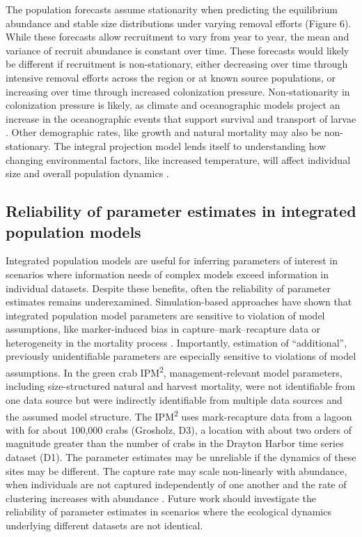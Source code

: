 \documentclass{article}
\begin{document}
The population forecasts assume stationarity when predicting the equilibrium abundance and stable size distributions under varying removal efforts (Figure 6). While these forecasts allow recruitment to vary from year to year, the mean and variance of recruit abundance is constant over time. These forecasts would likely be different if recruitment is non-stationary, either decreasing over time through intensive removal efforts across the region or at known source populations, or increasing over time through increased colonization pressure. Non-stationarity in colonization pressure is likely, as climate and oceanographic models project an increase in the oceanographic events that support survival and transport of larvae \parencite{du2024dispersal, cai2021changing}. Other demographic rates, like growth and natural mortality may also be non-stationary. The integral projection model lends itself to understanding how changing environmental factors, like increased temperature, will affect individual size and overall population dynamics \parencite{plard2019ipm, dahlgren2011incorporating}. 

\subsection{Reliability of parameter estimates in integrated population models}

Integrated population models are useful for inferring parameters of interest in scenarios where information needs of complex models exceed information in individual datasets. Despite these benefits, often the reliability of parameter estimates remains underexamined. Simulation-based approaches have shown that integrated population model parameters are sensitive to violation of model assumptions, like marker-induced bias in capture–mark–recapture data or heterogeneity in the mortality process \parencite{riecke2019integrated}. Importantly, estimation of “additional”, previously unidentifiable parameters are especially sensitive to violations of model assumptions. In the green crab IPM\textsuperscript{2}, management-relevant model parameters, including size-structured natural and harvest mortality, were not identifiable from one data source but were indirectly identifiable from multiple data sources and the assumed model structure. The IPM\textsuperscript{2} uses mark-recapture data from a lagoon with  for about 100,000 crabs (Grosholz, D3), a location with about two orders of magnitude greater than the number of crabs in the Drayton Harbor time series dataset (D1). The parameter estimates may be unreliable if the dynamics of these sites may be different. The capture rate may scale non-linearly with abundance, when individuals are not captured independently of one another and the rate of clustering increases with abundance \parencite{mccarthy2013influence}. Future work should investigate the reliability of parameter estimates in scenarios where the ecological dynamics underlying different datasets are not identical. 
\end{document}
